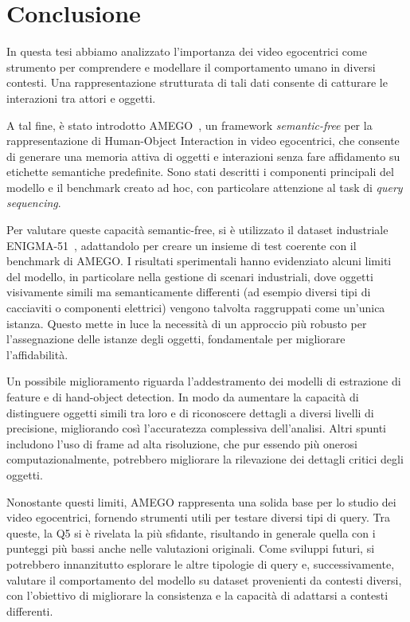 \chapter*{Conclusione} %

In questa tesi abbiamo analizzato l'importanza dei video egocentrici come strumento per comprendere e modellare il comportamento umano in diversi contesti. Una rappresentazione strutturata di tali dati consente di catturare le interazioni tra attori e oggetti.

A tal fine, è stato introdotto AMEGO~\cite{goletto2024amego}, un framework \emph{semantic-free} per la rappresentazione di Human-Object Interaction in video egocentrici, che consente di generare una memoria attiva di oggetti e interazioni senza fare affidamento su etichette semantiche predefinite. Sono stati descritti i componenti principali del modello e il benchmark creato ad hoc, con particolare attenzione al task di \emph{query sequencing}.

Per valutare queste capacità semantic-free, si è utilizzato il dataset industriale ENIGMA-51~\cite{ragusa2023enigma51}, adattandolo per creare un insieme di test coerente con il benchmark di AMEGO. I risultati sperimentali hanno evidenziato alcuni limiti del modello, in particolare nella gestione di scenari industriali, dove oggetti visivamente simili ma semanticamente differenti (ad esempio diversi tipi di cacciaviti o componenti elettrici) vengono talvolta raggruppati come un'unica istanza. Questo mette in luce la necessità di un approccio più robusto per l'assegnazione delle istanze degli oggetti, fondamentale per migliorare l'affidabilità.

Un possibile miglioramento riguarda l'addestramento dei modelli di estrazione di feature e di hand-object detection. In modo da aumentare la capacità di distinguere oggetti simili tra loro e di riconoscere dettagli a diversi livelli di precisione, migliorando così l’accuratezza complessiva dell’analisi. Altri spunti includono l’uso di frame ad alta risoluzione, che pur essendo più onerosi computazionalmente, potrebbero migliorare la rilevazione dei dettagli critici degli oggetti.

Nonostante questi limiti, AMEGO rappresenta una solida base per lo studio dei video egocentrici, fornendo strumenti utili per testare diversi tipi di query. Tra queste, la Q5 si è rivelata la più sfidante, risultando in generale quella con i punteggi più bassi anche nelle valutazioni originali. Come sviluppi futuri, si potrebbero innanzitutto esplorare le altre tipologie di query e, successivamente, valutare il comportamento del modello su dataset provenienti da contesti diversi, con l'obiettivo di migliorare la consistenza e la capacità di adattarsi a contesti differenti.


